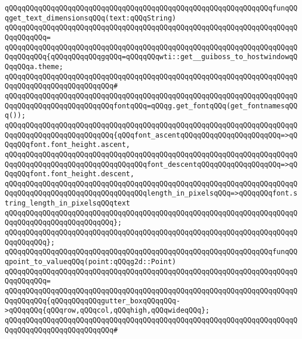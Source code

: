 \verb|qQQqqQQqqQQqqQQqqQQqqQQqqQQqqQQqqQQqqQQqqQQqqQQqqQQqqQQqqQQqqQQqfunqQQqget_text_dimensionsqQQq(text:qQQqString)|\newline
\verb|qQQqqQQqqQQqqQQqqQQqqQQqqQQqqQQqqQQqqQQqqQQqqQQqqQQqqQQqqQQqqQQqqQQqqQQqqQQqqQQq=|\newline
\verb|qQQqqQQqqQQqqQQqqQQqqQQqqQQqqQQqqQQqqQQqqQQqqQQqqQQqqQQqqQQqqQQqqQQqqQQqqQQqqQQq{qQQqqQQqqQQqgqQQq=qQQqqQQqwti::get__guiboss_to_hostwindowqQQqqQQqa.theme;|\newline
\verb|qQQqqQQqqQQqqQQqqQQqqQQqqQQqqQQqqQQqqQQqqQQqqQQqqQQqqQQqqQQqqQQqqQQqqQQqqQQqqQQqqQQqqQQqqQQqqQQq#|\newline
\verb|qQQqqQQqqQQqqQQqqQQqqQQqqQQqqQQqqQQqqQQqqQQqqQQqqQQqqQQqqQQqqQQqqQQqqQQqqQQqqQQqqQQqqQQqqQQqqQQqfontqQQq=qQQqg.get_fontqQQq(get_fontnamesqQQq());|\newline
\newline
\verb|qQQqqQQqqQQqqQQqqQQqqQQqqQQqqQQqqQQqqQQqqQQqqQQqqQQqqQQqqQQqqQQqqQQqqQQqqQQqqQQqqQQqqQQqqQQqqQQq{qQQqfont_ascentqQQqqQQqqQQqqQQqqQQqqQQq=>qQQqqQQqfont.font_height.ascent,|\newline
\verb|qQQqqQQqqQQqqQQqqQQqqQQqqQQqqQQqqQQqqQQqqQQqqQQqqQQqqQQqqQQqqQQqqQQqqQQqqQQqqQQqqQQqqQQqqQQqqQQqqQQqqQQqfont_descentqQQqqQQqqQQqqQQqqQQq=>qQQqqQQqfont.font_height.descent,|\newline
\verb|qQQqqQQqqQQqqQQqqQQqqQQqqQQqqQQqqQQqqQQqqQQqqQQqqQQqqQQqqQQqqQQqqQQqqQQqqQQqqQQqqQQqqQQqqQQqqQQqqQQqqQQqlength_in_pixelsqQQq=>qQQqqQQqfont.string_length_in_pixelsqQQqtext|\newline
\verb|qQQqqQQqqQQqqQQqqQQqqQQqqQQqqQQqqQQqqQQqqQQqqQQqqQQqqQQqqQQqqQQqqQQqqQQqqQQqqQQqqQQqqQQqqQQqqQQq};|\newline
\verb|qQQqqQQqqQQqqQQqqQQqqQQqqQQqqQQqqQQqqQQqqQQqqQQqqQQqqQQqqQQqqQQqqQQqqQQqqQQqqQQq};|\newline
\newline
\verb|qQQqqQQqqQQqqQQqqQQqqQQqqQQqqQQqqQQqqQQqqQQqqQQqqQQqqQQqqQQqqQQqfunqQQqpoint_to_valueqQQq(point:qQQqg2d::Point)|\newline
\verb|qQQqqQQqqQQqqQQqqQQqqQQqqQQqqQQqqQQqqQQqqQQqqQQqqQQqqQQqqQQqqQQqqQQqqQQqqQQqqQQq=|\newline
\verb|qQQqqQQqqQQqqQQqqQQqqQQqqQQqqQQqqQQqqQQqqQQqqQQqqQQqqQQqqQQqqQQqqQQqqQQqqQQqqQQq{qQQqqQQqqQQqgutter_boxqQQqqQQq->qQQqqQQq{qQQqrow,qQQqcol,qQQqhigh,qQQqwideqQQq};|\newline
\verb|qQQqqQQqqQQqqQQqqQQqqQQqqQQqqQQqqQQqqQQqqQQqqQQqqQQqqQQqqQQqqQQqqQQqqQQqqQQqqQQqqQQqqQQqqQQqqQQq#|\newline

